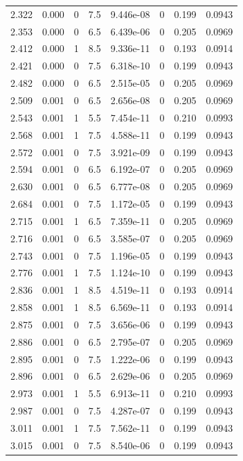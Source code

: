 \documentclass[preview]{standalone}
\begin{document}
{{{\begin{tabular}{L{1.2cm}C{1.2cm} C{0.3cm}C{0.5cm} C{1.4cm}C{1.4cm} C{1.4cm}C{1.4cm}}
  2.322  &  0.000  & 0     & 7.5 &  9.446e-08  & 0  & 0.199 &  0.0943   \\ 
  2.353  &  0.000  & 0     & 6.5 &  6.439e-06  & 0  & 0.205 &  0.0969   \\ 
  2.412  &  0.000  & 1     & 8.5 &  9.336e-11  & 0  & 0.193 &  0.0914   \\ 
  2.421  &  0.000  & 0     & 7.5 &  6.318e-10  & 0  & 0.199 &  0.0943   \\ 
  2.482  &  0.000  & 0     & 6.5 &  2.515e-05  & 0  & 0.205 &  0.0969   \\ 
  2.509  &  0.001  & 0     & 6.5 &  2.656e-08  & 0  & 0.205 &  0.0969   \\ 
  2.543  &  0.001  & 1     & 5.5 &  7.454e-11  & 0  & 0.210 &  0.0993   \\ 
  2.568  &  0.001  & 1     & 7.5 &  4.588e-11  & 0  & 0.199 &  0.0943   \\ 
  2.572  &  0.001  & 0     & 7.5 &  3.921e-09  & 0  & 0.199 &  0.0943   \\ 
  2.594  &  0.001  & 0     & 6.5 &  6.192e-07  & 0  & 0.205 &  0.0969   \\ 
  2.630  &  0.001  & 0     & 6.5 &  6.777e-08  & 0  & 0.205 &  0.0969   \\ 
  2.684  &  0.001  & 0     & 7.5 &  1.172e-05  & 0  & 0.199 &  0.0943   \\ 
  2.715  &  0.001  & 1     & 6.5 &  7.359e-11  & 0  & 0.205 &  0.0969   \\ 
  2.716  &  0.001  & 0     & 6.5 &  3.585e-07  & 0  & 0.205 &  0.0969   \\ 
  2.743  &  0.001  & 0     & 7.5 &  1.196e-05  & 0  & 0.199 &  0.0943   \\ 
  2.776  &  0.001  & 1     & 7.5 &  1.124e-10  & 0  & 0.199 &  0.0943   \\ 
  2.836  &  0.001  & 1     & 8.5 &  4.519e-11  & 0  & 0.193 &  0.0914   \\ 
  2.858  &  0.001  & 1     & 8.5 &  6.569e-11  & 0  & 0.193 &  0.0914   \\ 
  2.875  &  0.001  & 0     & 7.5 &  3.656e-06  & 0  & 0.199 &  0.0943   \\ 
  2.886  &  0.001  & 0     & 6.5 &  2.795e-07  & 0  & 0.205 &  0.0969   \\ 
  2.895  &  0.001  & 0     & 7.5 &  1.222e-06  & 0  & 0.199 &  0.0943   \\ 
  2.896  &  0.001  & 0     & 6.5 &  2.629e-06  & 0  & 0.205 &  0.0969   \\ 
  2.973  &  0.001  & 1     & 5.5 &  6.913e-11  & 0  & 0.210 &  0.0993   \\ 
  2.987  &  0.001  & 0     & 7.5 &  4.287e-07  & 0  & 0.199 &  0.0943   \\ 
  3.011  &  0.001  & 1     & 7.5 &  7.562e-11  & 0  & 0.199 &  0.0943   \\ 
  3.015  &  0.001  & 0     & 7.5 &  8.540e-06  & 0  & 0.199 &  0.0943   \\ 
\hline 
\end{tabular} 

}}}
\end{document}
